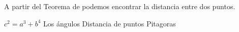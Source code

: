 
\question A partir del Teorema de \fillin \enspace podemos encontrar la
          distancia entre dos puntos.

  \begin{oneparchoices}
    \choice $c^2 = a^3 + b^4$
    \choice Los ángulos
    \choice Distancia de puntos
    \CorrectChoice Pitagoras
  \end{oneparchoices}
  \answerline[D]
